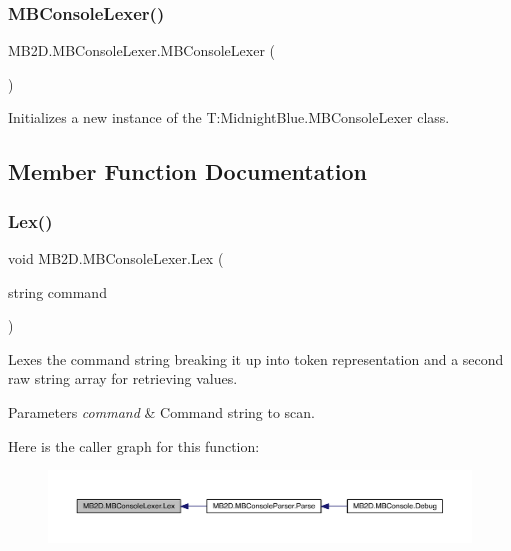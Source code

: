 \subsubsection{\texorpdfstring{M\+B\+Console\+Lexer()}{MBConsoleLexer()}}
{\footnotesize\ttfamily M\+B2\+D.\+M\+B\+Console\+Lexer.\+M\+B\+Console\+Lexer (\begin{DoxyParamCaption}{ }\end{DoxyParamCaption})\hspace{0.3cm}{\ttfamily [inline]}}



Initializes a new instance of the T\+:\+Midnight\+Blue.\+M\+B\+Console\+Lexer class. 



\subsection{Member Function Documentation}
\hypertarget{class_m_b2_d_1_1_m_b_console_lexer_a6c09fcdb1a36eff50201b9f5469bd55c}{}\label{class_m_b2_d_1_1_m_b_console_lexer_a6c09fcdb1a36eff50201b9f5469bd55c} 
\subsubsection{\texorpdfstring{Lex()}{Lex()}}
{\footnotesize\ttfamily void M\+B2\+D.\+M\+B\+Console\+Lexer.\+Lex (\begin{DoxyParamCaption}\item[{string}]{command }\end{DoxyParamCaption})\hspace{0.3cm}{\ttfamily [inline]}}



Lexes the command string breaking it up into token representation and a second raw string array for retrieving values. 


\begin{DoxyParams}{Parameters}
{\em command} & Command string to scan.\\
\hline
\end{DoxyParams}
Here is the caller graph for this function\+:\nopagebreak
\begin{figure}[H]
\begin{center}
\leavevmode
\includegraphics[width=350pt]{class_m_b2_d_1_1_m_b_console_lexer_a6c09fcdb1a36eff50201b9f5469bd55c_icgraph}
\end{center}
\end{figure}
\hypertarget{class_m_b2_d_1_1_m_b_console_lexer_ab083ced0d68a7f7278fbb462a9c60410}{}\label{class_m_b2_d_1_1_m_b_console_lexer_ab083ced0d68a7f7278fbb462a9c60410} 
